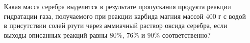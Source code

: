Какая масса серебра выделится в результате пропускания продукта реакции гидратации газа, получаемого при реакции карбида магния массой 400 г с водой в присутствии солей ртути через аммиачный раствор оксида серебра, если выходы описанных реакций равны 80\%, 76\% и 90\% соответственно?

